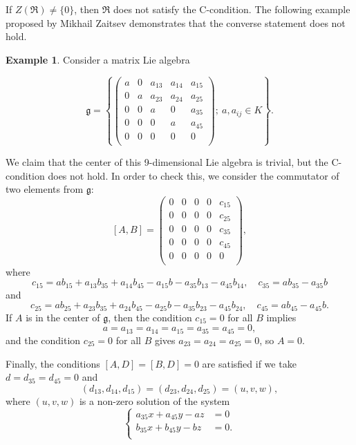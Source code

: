 \documentclass[a4paper,draft,reqno,12pt]{amsart}
\theoremstyle{definition}
\newtheorem{example}{Example}
\theoremstyle{remark}
\def\ggg{\mathfrak{g}}
\begin{document}
If $Z(\mathfrak{R})\ne\{0\}$, then $\mathfrak{R}$ does not satisfy the C-condition. The following example proposed by Mikhail Zaitsev \cite[Remark~3.5]{A4} demonstrates that the converse statement does not hold.  

\begin{example}
\label{exx}
Consider a matrix Lie algebra

\smallskip

$$
\ggg=\left\{\left(
 \begin{array}{ccccc}
 a & 0 & a_{13} & a_{14} & a_{15} \\
 0 & a & a_{23} & a_{24} & a_{25} \\
 0 & 0 & a & 0 & a_{35} \\
 0 & 0 & 0 & a & a_{45} \\
 0 & 0 & 0 & 0 & 0 \\
 \end{array}
 \right);  \ a,a_{ij} \in K \right\}.
$$

\medskip

We claim that the center of this 9-dimensional Lie algebra is trivial, but the C-condition does not hold. In order to check this, we consider the commutator of two elements from $\ggg$:
$$
[A,B]=\left(
\begin{array}{ccccc}
 0 & 0 & 0 & 0 & c_{15} \\
 0 & 0 & 0 & 0 & c_{25} \\
 0 & 0 & 0 & 0 & c_{35} \\ 
 0 & 0 & 0 & 0 & c_{45} \\
 0 & 0 & 0 & 0 & 0 \\
\end{array}
\right),
$$
where
$$
c_{15}=ab_{15}+a_{13}b_{35}+a_{14}b_{45}-a_{15}b-a_{35}b_{13}-a_{45}b_{14}, \quad c_{35}= ab_{35}-a_{35}b
$$
and 
$$
c_{25}=ab_{25}+a_{23}b_{35}+a_{24}b_{45}-a_{25}b-a_{35}b_{23}-a_{45}b_{24}, \quad c_{45}= ab_{45}-a_{45}b.
$$
If $A$ is in the center of $\ggg$, then the condition $c_{15}=0$ for all $B$ implies 
$$
a=a_{13}=a_{14}=a_{15}=a_{35}=a_{45}=0,
$$ 
and the condition $c_{25}=0$ for all $B$ gives $a_{23}=a_{24}=a_{25}=0$, so $A=0$. 

\smallskip

Finally, the conditions $[A,D]=[B,D]=0$ are satisfied if we take $d=d_{35}=d_{45}=0$ and
$$
(d_{13},d_{14},d_{15})=(d_{23},d_{24},d_{25})=(u,v,w), 
$$
where $(u,v,w)$ is a non-zero solution of the system
\[
\left\{
\begin{aligned}
a_{35}x+a_{45}y-az & = 0\\
b_{35}x+b_{45}y-bz & = 0.\\
\end{aligned}
\right.
\] 
\end{example} 
\end{document}
